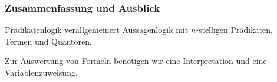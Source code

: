 \documentclass[aspectratio=1610,onlymath]{beamer}
\begin{document}
\begin{frame}\frametitle{Zusammenfassung und Ausblick}

Prädikatenlogik verallgemeinert Aussagenlogik mit $n$-stelligen Prädikaten, Termen und Quantoren.
\bigskip

Zur Auswertung von Formeln benötigen wir eine Interpretation und eine Variablenzuweisung.
\bigskip



\end{frame}
\end{document}
